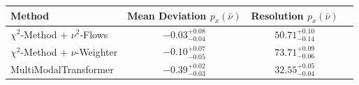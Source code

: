     \begin{tabular}{lccc}
        \toprule
        Method & Mean Deviation $p_{x}(\bar{\nu})$ & Resolution $p_{x}(\bar{\nu})$ \\
        \midrule
        $\chi^2$-Method + $\nu^2$-Flows & $-0.03^{+0.08}_{-0.04}$ & $50.71^{+0.10}_{-0.14}$ \\
        $\chi^2$-Method + $\nu$-Weighter & $-0.10^{+0.07}_{-0.05}$ & $73.71^{+0.09}_{-0.06}$ \\
        MultiModalTransformer & $-0.39^{+0.02}_{-0.03}$ & $32.55^{+0.05}_{-0.04}$ \\
        \bottomrule
    \end{tabular}